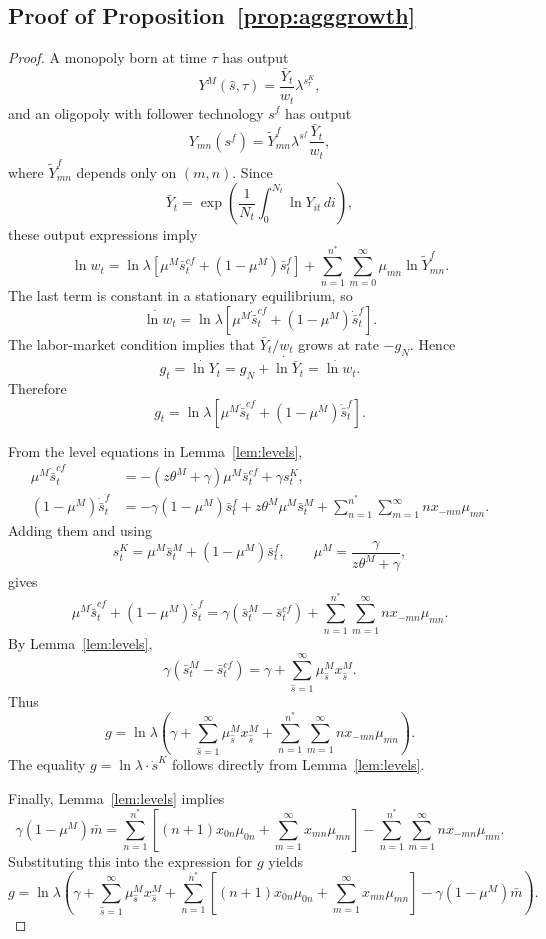 \documentclass[12pt]{article}
\begin{document}
\subsection{Proof of Proposition~\ref{prop:agggrowth}}

\begin{proof}
A monopoly born at time \(\tau\) has output
\[
Y^M(\hat{s},\tau)=\frac{\bar Y_t}{w_t}\lambda^{s^K_\tau},
\]
and an oligopoly with follower technology \(s^f\) has output
\[
Y_{mn}(s^f)=\tilde Y^f_{mn}\lambda^{s^f}\frac{\bar Y_t}{w_t},
\]
where \(\tilde Y^f_{mn}\) depends only on \((m,n)\). Since
\[
\bar Y_t=\exp\left(\frac{1}{N_t}\int_0^{N_t}\ln Y_{it}\,di\right),
\]
these output expressions imply
\[
\ln w_t
=
\ln\lambda\left[
\mu^M\bar{s}^{cf}_t+(1-\mu^M)\bar{s}^f_t
\right]
+
\sum_{n=1}^{n^\ast}\sum_{m=0}^\infty \mu_{mn}\ln\tilde Y^f_{mn}.
\]
The last term is constant in a stationary equilibrium, so
\[
\dot{\ln w}_t
=
\ln\lambda\left[
\mu^M\dot{\bar{s}}^{cf}_t+(1-\mu^M)\dot{\bar{s}}^f_t
\right].
\]
The labor-market condition implies that \(\bar Y_t/w_t\) grows at rate \(-g_N\). Hence
\[
g_t=\dot{\ln Y}_t
=g_N+\dot{\ln\bar Y}_t
=\dot{\ln w}_t.
\]
Therefore
\[
g_t
=
\ln\lambda\left[
\mu^M\dot{\bar{s}}^{cf}_t+(1-\mu^M)\dot{\bar{s}}^f_t
\right].
\]

From the level equations in Lemma~\ref{lem:levels},
\begin{align*}
\mu^M\dot{\bar{s}}^{cf}_t
&=-(z\theta^M+\gamma)\mu^M\bar{s}^{cf}_t+\gamma s^K_t,\\
(1-\mu^M)\dot{\bar{s}}^f_t
&=-\gamma(1-\mu^M)\bar{s}^f_t
+z\theta^M\mu^M\bar{s}^M_t+\sum_{n=1}^{n^\ast}\sum_{m=1}^\infty n x_{-mn}\mu_{mn}.
\end{align*}
Adding them and using
\[
s^K_t=\mu^M\bar{s}^M_t+(1-\mu^M)\bar{s}^f_t,
\qquad
\mu^M=\frac{\gamma}{z\theta^M+\gamma},
\]
gives
\[
\mu^M\dot{\bar{s}}^{cf}_t+(1-\mu^M)\dot{\bar{s}}^f_t
=
\gamma(\bar{s}^M_t-\bar{s}^{cf}_t)+\sum_{n=1}^{n^\ast}\sum_{m=1}^\infty n x_{-mn}\mu_{mn}.
\]
By Lemma~\ref{lem:levels},
\[
\gamma(\bar{s}^M_t-\bar{s}^{cf}_t)=\gamma+\sum_{\hat{s}=1}^\infty \mu^M_{\hat{s}}x^M_{\hat{s}}.
\]
Thus
\[ g=\ln\lambda\left(\gamma+\sum_{\hat{s}=1}^\infty \mu^M_{\hat{s}}x^M_{\hat{s}}+\sum_{n=1}^{n^\ast}\sum_{m=1}^\infty n x_{-mn}\mu_{mn}\right). \]
The equality \(g=\ln\lambda\cdot \dot{s}^K\) follows directly from Lemma~\ref{lem:levels}.

Finally, Lemma~\ref{lem:levels} implies
\[ \gamma(1-\mu^M)\bar m=\sum_{n=1}^{n^\ast}\left[(n+1)x_{0n}\mu_{0n}+\sum_{m=1}^\infty x_{mn}\mu_{mn}\right]-\sum_{n=1}^{n^\ast}\sum_{m=1}^\infty n x_{-mn}\mu_{mn}. \]
Substituting this into the expression for \(g\) yields
\[ g = \ln\lambda\left( \gamma +\sum_{\hat{s}=1}^\infty \mu^M_{\hat{s}}x^M_{\hat{s}}
+\sum_{n=1}^{n^\ast} \left[(n+1)x_{0n}\mu_{0n} +\sum_{m=1}^\infty x_{mn}\mu_{mn}\right]
-\gamma(1-\mu^M)\bar m \right). \]
\end{proof}
\end{document}
